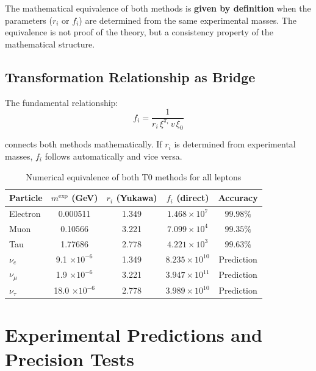 	\begin{keypoint}
		The mathematical equivalence of both methods is \textbf{given by definition} when the parameters ($r_i$ or $f_i$) are determined from the same experimental masses. The equivalence is not proof of the theory, but a consistency property of the mathematical structure.
	\end{keypoint}
	
	\subsection{Transformation Relationship as Bridge}
	\label{subsec:transformation_relationship}
	
	The fundamental relationship:
	\begin{equation}
		f_i = \frac{1}{r_i \, \xi^{\pi_i} \, v \, \xi_0}
		\label{eq:transformation_bridge}
	\end{equation}
	
	connects both methods mathematically. If $r_i$ is determined from experimental masses, $f_i$ follows automatically and vice versa.
	
	\begin{table}[H]
		\centering
		\begin{tabular}{lcccc}
			\toprule
			\textbf{Particle} & \textbf{$m^{\text{exp}}$ (GeV)} & \textbf{$r_i$ (Yukawa)} & \textbf{$f_i$ (direct)} & \textbf{Accuracy} \\
			\midrule
			Electron & 0.000511 & 1.349 & $1.468 \times 10^{7}$ & $99.98\%$ \\
			Muon & 0.10566 & 3.221 & $7.099 \times 10^{4}$ & $99.35\%$ \\
			Tau & 1.77686 & 2.778 & $4.221 \times 10^{3}$ & $99.63\%$ \\
			\midrule
			$\nu_e$ & 9.1 $\times 10^{-6}$ & 1.349 & $8.235 \times 10^{10}$ & Prediction \\
			$\nu_\mu$ & 1.9 $\times 10^{-6}$ & 3.221 & $3.947 \times 10^{11}$ & Prediction \\
			$\nu_\tau$ & 18.0 $\times 10^{-6}$ & 2.778 & $3.989 \times 10^{10}$ & Prediction \\
			\bottomrule
		\end{tabular}
		\caption{Numerical equivalence of both T0 methods for all leptons}
		\label{tab:numerical_equivalence_complete}
	\end{table}
	
	\section{Experimental Predictions and Precision Tests}
	\label{sec:experimental_predictions}
	

